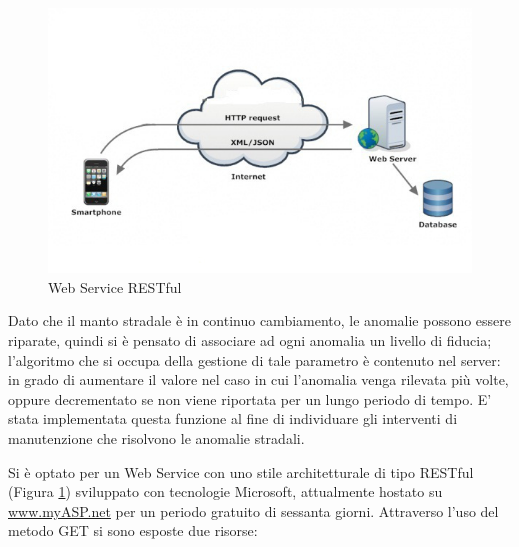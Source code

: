\documentclass[a4paper, 11pt]{article} %
\begin{document}
\begin{figure}[h]
	\begin{center}
		\includegraphics[width=\textwidth]{images/rest.jpg}
	\end{center}
	\caption{Web Service RESTful}
	\label{fig:rest}
\end{figure}

 Dato che il manto stradale è in continuo cambiamento, le anomalie possono essere riparate, quindi si è pensato di associare ad ogni anomalia un livello di fiducia; l'algoritmo che si occupa della gestione di tale parametro è contenuto nel server: in grado di aumentare il valore nel caso in cui l'anomalia venga rilevata più volte, oppure decrementato se non viene riportata per un lungo periodo di tempo. E' stata implementata questa funzione al fine di individuare gli interventi di manutenzione che risolvono le anomalie stradali.

Si è optato per un Web Service con uno stile architetturale di tipo RESTful (Figura \ref{fig:rest}) sviluppato con tecnologie Microsoft, attualmente hostato su \url{www.myASP.net} per un periodo gratuito di sessanta giorni. 
Attraverso l'uso del metodo GET si sono esposte due risorse:
\end{document}
